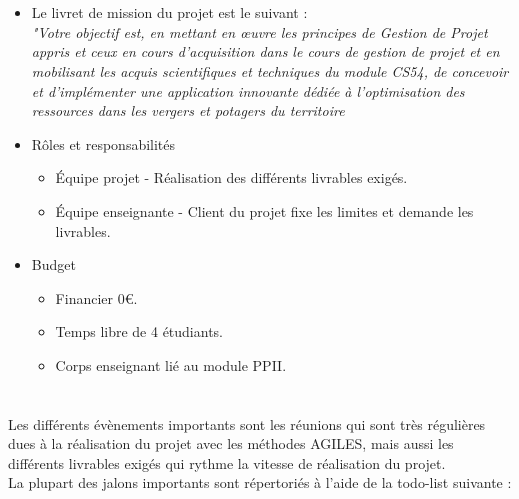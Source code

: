 \documentclass{report}
\begin{document}
\section*{\color{orange}{\Large Organisation / ressources, budget}}
\begin{itemize}
    \item Le livret de mission du projet est le suivant : \\ 
    \textit{"Votre objectif est, en mettant en œuvre les principes de Gestion de Projet appris et
    ceux en cours d’acquisition dans le cours de gestion de projet et en mobilisant les acquis
    scientifiques et techniques du module CS54, de concevoir et d’implémenter une application
    innovante dédiée à l’optimisation des ressources dans les vergers et potagers du territoire}
    \item Rôles et responsabilités
    \begin{itemize}
        \item Équipe projet - Réalisation des différents livrables exigés.
        \item Équipe enseignante - Client du projet fixe les limites et demande les livrables.
    \end{itemize}
    \item Budget
    \begin{itemize}
        \item Financier 0€.
        \item Temps libre de 4 étudiants.
        \item Corps enseignant lié au module PPII.
    \end{itemize}
    
\end{itemize}
\section*{\color{orange}{\Large Jalons : échéancier / évènements importants }}
Les différents évènements importants sont les réunions qui sont très régulières dues à la réalisation du projet avec les méthodes AGILES, mais aussi les différents livrables exigés qui rythme la vitesse de réalisation du projet.
\vspace{0.5cm} \\
La plupart des jalons importants sont répertoriés à l'aide de la todo-list suivante :
\end{document}
